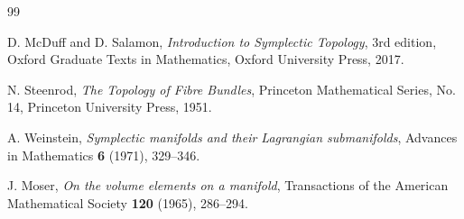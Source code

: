 \documentclass{amsart}
\theoremstyle{definition}
\begin{document}
\begin{thebibliography}{99}

D. McDuff and D. Salamon,
\emph{Introduction to Symplectic Topology},
3rd edition, Oxford Graduate Texts in Mathematics, Oxford University Press, 2017.

N. Steenrod,
\emph{The Topology of Fibre Bundles},
Princeton Mathematical Series, No. 14, Princeton University Press, 1951.

A. Weinstein,
\emph{Symplectic manifolds and their Lagrangian submanifolds},
Advances in Mathematics \textbf{6} (1971), 329--346.

J. Moser,
\emph{On the volume elements on a manifold},
Transactions of the American Mathematical Society \textbf{120} (1965), 286--294.

\end{thebibliography}
\end{document}
